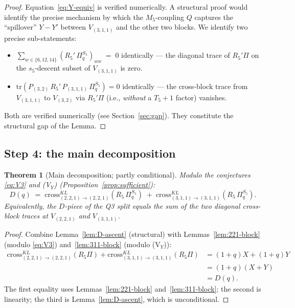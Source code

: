 \documentclass[11pt]{article}
\newtheorem{theorem}{Theorem}
\theoremstyle{definition}
\begin{document}
\begin{proof}
Equation~\eqref{eq:Y-equiv} is verified numerically. A structural proof would
identify the precise mechanism by which the $M_5$-coupling $Q$ captures the
``spillover'' $Y - Y'$ between $V_{(3,1,1)}$ and the other two blocks. We
identify two precise sub-statements:
\begin{itemize}[leftmargin=2em,topsep=0.3em,itemsep=0.2em]
\item[\textbf{(V1)}] $\sum_{w \in \{6, 12, 14\}} (R_5'\, \Pi_q^{S_5})_{ww} \;=\; 0$ identically — the diagonal trace of $R_5' \Pi$ on the $s_5$-descent subset of $V_{(3,1,1)}$ is zero.
\item[\textbf{(V2)}] $\mathrm{tr}(P_{(3,2)}\, R_5'\, P_{(3,1,1)}\, \Pi_q^{S_5}) = 0$ identically — the cross-block trace from $V_{(3,1,1)}$ to $V_{(3,2)}$ via $R_5'\Pi$ (i.e., \emph{without} a $T_5+1$ factor) vanishes.
\end{itemize}
Both are verified numerically (see Section~\ref{sec:gap}). They constitute
the structural gap of the Lemma.
\end{proof}

\subsection*{Step 4: the main decomposition}

\begin{theorem}[Main decomposition; partly conditional]\label{thm:main}
Modulo the conjectures \eqref{eq:V3} and (V$_Y$) (Proposition~\ref{prop:sufficient}):
\[
D(q) \;=\; \mathrm{cross}_{(2,2,1)\to(2,2,1)}^{KL}(R_5\,\Pi_q^{S_5}) \;+\; \mathrm{cross}_{(3,1,1)\to(3,1,1)}^{KL}(R_5\,\Pi_q^{S_5}).
\]
Equivalently, the $D$-piece of the Q3 split equals the sum of the two
diagonal cross-block traces at $V_{(2,2,1)}$ and $V_{(3,1,1)}$.
\end{theorem}

\begin{proof}
Combine Lemma~\ref{lem:D-ascent} (structural) with Lemmas~\ref{lem:221-block} (modulo \eqref{eq:V3}) and~\ref{lem:311-block} (modulo (V$_Y$)):
\begin{align*}
\mathrm{cross}_{(2,2,1)\to(2,2,1)}^{KL}(R_5\Pi) + \mathrm{cross}_{(3,1,1)\to(3,1,1)}^{KL}(R_5\Pi)
&= (1+q) X + (1+q) Y \\
&= (1+q)(X + Y) \\
&= D(q).
\end{align*}
The first equality uses Lemmas~\ref{lem:221-block} and~\ref{lem:311-block}; the second is linearity; the third is Lemma~\ref{lem:D-ascent}, which is unconditional.
\end{proof}
\end{document}
